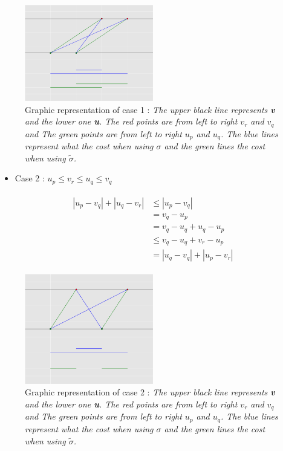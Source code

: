 \documentclass{article}
\begin{document}
	
	\begin{figure}
      \includegraphics[width=0.5\textwidth]{demo_sort1.png}
    \caption{Graphic representation of case 1 : \emph{The upper black line represents \textbf{v} and the lower one \textbf{u}. The red points are from left to right $v_r$ and $v_q$ and The green points are from left to right $u_p$ and $u_q$. The blue lines represent what the cost when using $\sigma$ and the green lines  the cost when using $\tilde{\sigma}$. } }
\end{figure}

\begin{itemize}
	\item Case 2 : $u_p\leq v_r \leq u_q \leq v_q$
	\end{itemize}
	
	\begin{multline*}
	\begin{split}
	|u_p-v_q| + |u_q-v_r|	&\leq  |u_p-v_q|\\
		&=  v_q-u_p \\
	 	&= v_q-u_q+u_q-u_p\\
	 	&\leq v_q-u_q+v_r-u_p\\
	 	&= |u_q-v_q|+|u_p-v_r|
	\end{split}
	\end{multline*}

\begin{figure}
  
    \includegraphics[width=0.5\textwidth]{demo_sort2.png}
     \caption{Graphic representation of case 2 : \emph{The upper black line represents \textbf{v} and the lower one \textbf{u}. The red points are from left to right $v_r$ and $v_q$ and The green points are from left to right $u_p$ and $u_q$. The blue lines represent what the cost when using $\sigma$ and the green lines  the cost when using $\tilde{\sigma}$. } }
\end{figure}
\end{document}
